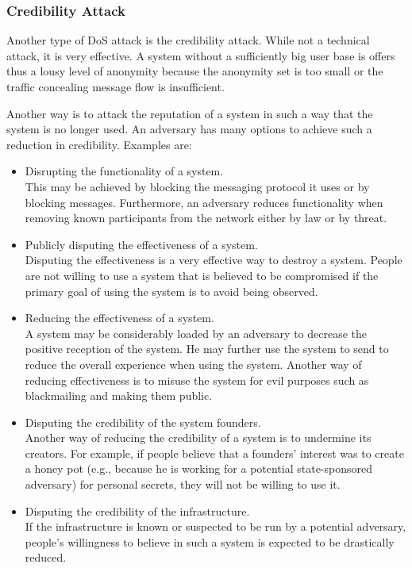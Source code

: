 \subsubsection{Credibility Attack}
Another type of DoS attack is the credibility attack. While not a technical attack, it is very effective. A system without a sufficiently big user base is offers thus a lousy level of anonymity because the anonymity set is too small or the traffic concealing message flow is insufficient. 

Another way is to attack the reputation of a system in such a way that the system is no longer used. An adversary has many options to achieve such a reduction in credibility. Examples are:
\begin{itemize}
	\item Disrupting the functionality of a system.\\ 
	This may be achieved by blocking the messaging protocol it uses or by blocking messages. Furthermore, an adversary reduces functionality when removing known participants from the network either by law or by threat.
	\item Publicly disputing the effectiveness of a system.\\
	Disputing the effectiveness is a very effective way to destroy a system. People are not willing to use a system that is believed to be compromised if the primary goal of using the system is to avoid being observed.
	\item Reducing the effectiveness of a system.\\
	A system may be considerably loaded by an adversary to decrease the positive reception of the system. He may further use the system to send  to reduce the overall experience when using the system. Another way of reducing effectiveness is to misuse the system for evil purposes such as blackmailing and making them public.
	\item Disputing the credibility of the system founders.\\
	Another way of reducing the credibility of a system is to undermine its creators. For example, if people believe that a founders' interest was to create a honey pot (e.g., because he is working for a potential state-sponsored adversary) for personal secrets, they will not be willing to use it.
	\item Disputing the credibility of the infrastructure.\\
	If the infrastructure is known or suspected to be run by a potential adversary, people's willingness to believe in such a system is expected to be drastically reduced.
\end{itemize}

